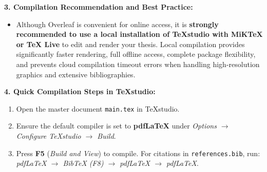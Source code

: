 \begin{onehalfspace}
\vspace{4pt}
\noindent
\textbf{3. Compilation Recommendation and Best Practice:}
\begin{itemize}[leftmargin=*,noitemsep,topsep=2pt]
  \item Although Overleaf is convenient for online access, it is \textbf{strongly recommended to use a local installation of TeXstudio with MiKTeX or TeX Live} to edit and render your thesis. Local compilation provides significantly faster rendering, full offline access, complete package flexibility, and prevents cloud compilation timeout errors when handling high-resolution graphics and extensive bibliographies.
\end{itemize}

\vspace{4pt}
\noindent
\textbf{4. Quick Compilation Steps in TeXstudio:}
\begin{enumerate}[leftmargin=*,noitemsep,topsep=2pt]
  \item Open the master document \texttt{main.tex} in TeXstudio.
  \item Ensure the default compiler is set to \textbf{pdfLaTeX} under \textit{Options $\to$ Configure TeXstudio $\to$ Build}.
  \item Press \textbf{F5} (\textit{Build and View}) to compile. For citations in \texttt{references.bib}, run: \textit{pdfLaTeX $\to$ BibTeX (F8) $\to$ pdfLaTeX $\to$ pdfLaTeX}.
\end{enumerate}
\end{onehalfspace}

